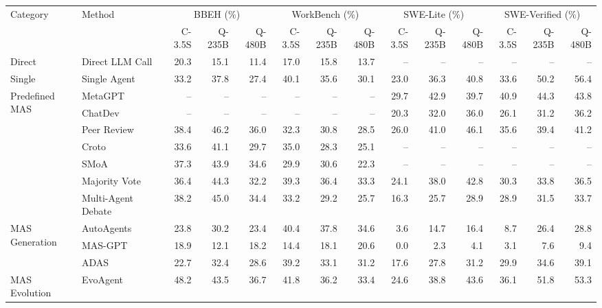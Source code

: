 \scriptsize
\setlength{\tabcolsep}{1.8pt}
\begin{adjustbox}{max width=\linewidth}
\begin{tabular}{llrrrrrrrrrrrr}
\toprule
\multirow{2}{*}{Category} & \multirow{2}{*}{Method}
& \multicolumn{3}{c}{BBEH (\%)}
& \multicolumn{3}{c}{WorkBench (\%)}
& \multicolumn{3}{c}{SWE-Lite (\%)}
& \multicolumn{3}{c}{SWE-Verified (\%)} \\
\cmidrule(lr){3-5}\cmidrule(lr){6-8}\cmidrule(lr){9-11}\cmidrule(lr){12-14}
& & C-3.5S & Q-235B & Q-480B & C-3.5S & Q-235B & Q-480B & C-3.5S & Q-235B & Q-480B & C-3.5S & Q-235B & Q-480B \\
\midrule
Direct & Direct LLM Call & 20.3 & 15.1 & 11.4 & 17.0 & 15.8 & 13.7 & -- & -- & -- & -- & -- & -- \\
Single & Single Agent & 33.2 & 37.8 & 27.4 & 40.1 & 35.6 & 30.1 & 23.0 & 36.3 & 40.8 & 33.6 & 50.2 & 56.4 \\
\midrule
\multirow{7}{*}{Predefined MAS}
& MetaGPT~\cite{hong2024metagpt} & -- & -- & -- & -- & -- & -- & 29.7 & 42.9 & 39.7 & 40.9 & 44.3 & 43.8 \\
& ChatDev~\cite{qian2024chatdev} & -- & -- & -- & -- & -- & -- & 20.3 & 32.0 & 36.0 & 26.1 & 31.2 & 36.2 \\
& Peer Review~\cite{xu2023peerreview} & 38.4 & 46.2 & 36.0 & 32.3 & 30.8 & 28.5 & 26.0 & 41.0 & 46.1 & 35.6 & 39.4 & 41.2 \\
& Croto~\cite{du2025croto} & 33.6 & 41.1 & 29.7 & 35.0 & 28.3 & 25.1 & -- & -- & -- & -- & -- & -- \\
& SMoA~\cite{li2025smoa} & 37.3 & 43.9 & 34.6 & 29.9 & 30.6 & 22.3 & -- & -- & -- & -- & -- & -- \\
& Majority Vote & 36.4 & 44.3 & 32.2 & 39.3 & 36.4 & 33.3 & 24.1 & 38.0 & 42.8 & 30.3 & 33.8 & 36.5 \\
& Multi-Agent Debate~\cite{du2023debate} & 38.2 & 45.0 & 34.4 & 33.2 & 29.2 & 25.7 & 16.3 & 25.7 & 28.9 & 28.9 & 31.5 & 33.7 \\
\midrule
\multirow{3}{*}{MAS Generation}
& AutoAgents~\cite{chen2023autoagents} & 23.8 & 30.2 & 23.4 & 40.4 & 37.8 & 34.6 & 3.6 & 14.7 & 16.4 & 8.7 & 26.4 & 28.8 \\
& MAS-GPT~\cite{ye2025masgpt} & 18.9 & 12.1 & 18.2 & 14.4 & 18.1 & 20.6 & 0.0 & 2.3 & 4.1 & 3.1 & 7.6 & 9.4 \\
& ADAS~\cite{hu2024adas} & 22.7 & 32.4 & 28.6 & 39.2 & 33.1 & 31.2 & 17.6 & 27.8 & 31.2 & 29.9 & 34.6 & 39.1 \\
\midrule
MAS Evolution & EvoAgent~\cite{yuan2024evoagent} & 48.2 & 43.5 & 36.7 & 41.8 & 36.2 & 33.4 & 24.6 & 38.8 & 43.6 & 36.1 & 51.8 & 53.3 \\

\end{tabular}
\end{adjustbox}
